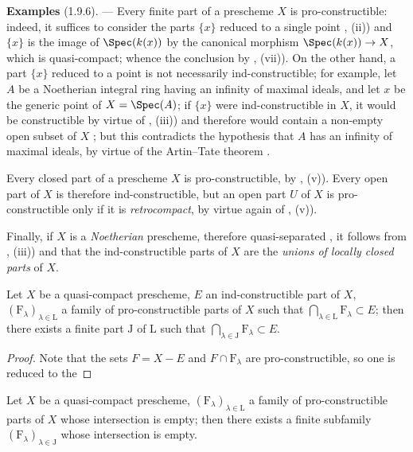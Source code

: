 \begin{env}[1.9.6]
\label{IV.1.9.6}
\textbf{Examples} (1.9.6). ---
Every finite part of a prescheme $X$ is pro-constructible: indeed, it suffices to consider the parts $\{x\}$ reduced to a single point , (ii)) and $\{x\}$ is the image of $\Spec(k(x))$ by the canonical morphism $\Spec(k(x))\to X$, which is quasi-compact; whence the conclusion by , (vii)).
On the other hand, a part $\{x\}$ reduced to a point is not necessarily ind-constructible; for example, let $A$ be a Noetherian integral ring having an infinity of maximal ideals, and let $x$ be the generic point of $X=\Spec(A)$; if $\{x\}$ were ind-constructible in $X$, it would be constructible by virtue of , (iii)) and therefore would contain a non-empty open subset of $X$ ; but this contradicts the hypothesis that $A$ has an infinity of maximal ideals, by virtue of the Artin--Tate theorem .

Every closed part of a prescheme $X$ is pro-constructible, by , (v)).
Every open part of $X$ is therefore ind-constructible, but an open part $U$ of $X$ is pro-constructible only if it is \emph{retrocompact}, by virtue again of , (v)).

Finally, if $X$ is a \emph{Noetherian} prescheme, therefore quasi-separated , it follows from , (iii)) and  that the ind-constructible parts of $X$ are the \emph{unions of locally closed parts} of $X$.
\end{env}

\begin{theorem}[1.9.7]
\label{IV.1.9.7}
Let $X$ be a quasi-compact prescheme, $E$ an ind-constructible part of $X$, $(\mathrm{F}_\lambda)_{\lambda\in\mathrm{L}}$ a family of pro-constructible parts of $X$ such that $\bigcap_{\lambda\in\mathrm{L}} \mathrm{F}_\lambda\subset E$; then there exists a finite part $\mathrm{J}$ of $\mathrm{L}$ such that $\bigcap_{\lambda\in\mathrm{J}} \mathrm{F}_\lambda\subset E$.
\end{theorem}

\begin{proof}
Note that the sets $F=X-E$ and $F\cap\mathrm{F}_\lambda$ are pro-constructible, so one is reduced to the
\end{proof}

\begin{corollary}[1.9.8]
\label{IV.1.9.8}
Let $X$ be a quasi-compact prescheme, $(\mathrm{F}_\lambda)_{\lambda\in\mathrm{L}}$ a family of pro-constructible parts of $X$ whose intersection is empty; then there exists a finite subfamily $(\mathrm{F}_\lambda)_{\lambda\in\mathrm{J}}$ whose intersection is empty.
\end{corollary}

